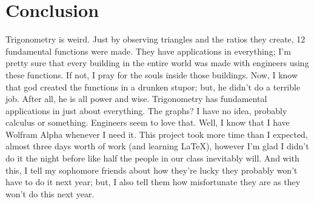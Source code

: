 \section{Conclusion}

Trigonometry is weird.
Just by observing triangles and the ratios they create, 12 fundamental functions were made.
They have applications in everything; I’m pretty sure that every building in the entire world was made with engineers using these functions.
If not, I pray for the souls inside those buildings.
Now, I know that god created the functions in a drunken stupor; but, he didn’t do a terrible job.
After all, he is all power and wise. Trigonometry has fundamental applications in just about everything.
The graphs? I have no idea, probably calculus or something.
Engineers seem to love that.
Well, I know that I have Wolfram Alpha whenever I need it.
This project took more time than I expected, almost three days worth of work (and learning LaTeX), however I’m glad I didn’t do it the night before like half the people in our class inevitably will.
And with this, I tell my sophomore friends about how they’re lucky they probably won’t have to do it next year; but, I also tell them how misfortunate they are as they won't do this next year.
